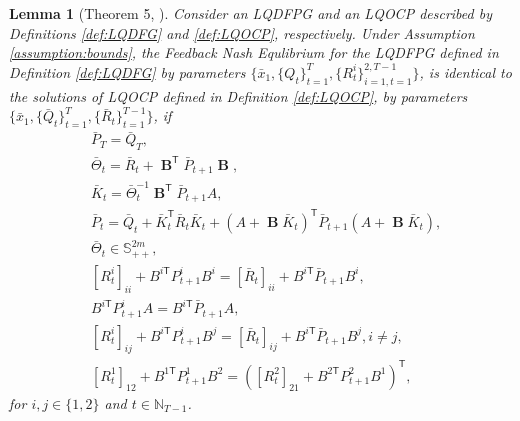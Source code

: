 \documentclass[letterpaper, 10 pt, conference]{ieeeconf}  %
\newcommand{\transpose}{\mathsf{T}}
\DeclareMathOperator{\contB}{\mathbf{B}}
\newtheorem{lemma}{Lemma}
\begin{document}
\begin{lemma}[Theorem 5, \cite{prasad_structure_2023}]\label{lemma:gamePGrelation}
    Consider an LQDFPG and an LQOCP described by Definitions \ref{def:LQDFG} and \ref{def:LQOCP}, respectively. Under Assumption \ref{assumption:bounds}, the Feedback Nash Equlibrium for the LQDFPG defined in Definition \ref{def:LQDFG} by parameters $\{\bar{x}_{1},\{Q_{t}\}_{t=1}^{T},\{R_{t}^{i}\}_{i=1,t=1}^{2,T-1}\}$, is identical to the solutions of LQOCP defined in Definition \ref{def:LQOCP}, by parameters $\{\bar{x}_{1},\{\bar{Q}_{t}\}_{t=1}^{T},\{\bar{R}_{t}\}_{t=1}^{T-1}\}$, if
    \begin{align*}
        &\bar{P}_{T} = \bar{Q}_{T},\\
        &\bar{\Theta}_{t} = \bar{R}_{t} + \contB^{\transpose}\bar{P}_{t+1}\contB,\\
        &\bar{K}_{t} = \bar{\Theta}_{t}^{-1}\contB^{\transpose}\bar{P}_{t+1}A,\\
        &\bar{P}_{t} = \bar{Q}_{t} + \bar{K}_{t}^{\transpose}\bar{R}_{t}\bar{K}_{t} + (A+\contB\bar{K}_{t})^{\transpose}\bar{P}_{t+1}(A+\contB\bar{K}_{t}),\\
        &\bar{\Theta}_{t} \in \mathbb{S}_{++}^{2m},\\
        &[R_{t}^{i}]_{ii} + B^{i\transpose}P_{t+1}^{i}B^{i} = [\bar{R}_{t}]_{ii} + B^{i\transpose}\bar{P}_{t+1}B^{i},\\
        &B^{i\transpose}P_{t+1}^{i}A = B^{i\transpose}\bar{P}_{t+1}A,\\
        &[R_{t}^{i}]_{ij} + B^{i\transpose}P_{t+1}^{i}B^{j} = [\bar{R}_{t}]_{ij} + B^{i\transpose}\bar{P}_{t+1}B^{j},i\neq j,\\
        &[R_{t}^{1}]_{12} + B^{1\transpose}P_{t+1}^{1}B^{2} = ([R^{2}_{t}]_{21} + B^{2\transpose}P^{2}_{t+1}B^{1})^{\transpose},
    \end{align*}
    for $i,j\in \{1,2\}$ and $t \in \mathbb{N}_{T-1}$. 
\end{lemma}
\end{document}
